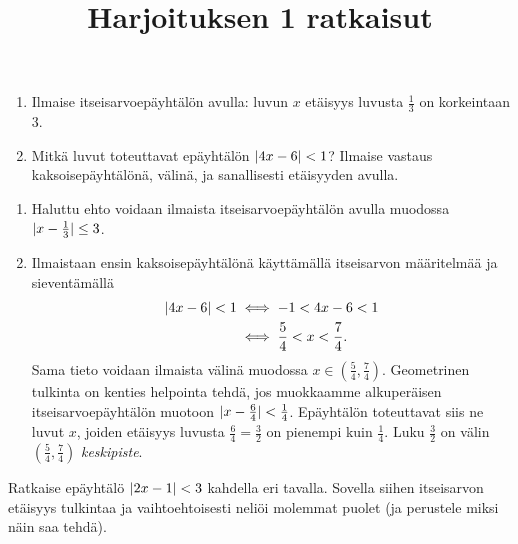\documentclass[12pt,a4paper]{article}
\title{Harjoituksen 1 ratkaisut}
\author{}
\date{}
\begin{document}
\maketitle

\noindent

\begin{exercise}
  \leavevmode\par
\begin{enumerate}[label=\alph*), nosep]
  \item Ilmaise itseisarvoepäyhtälön avulla: luvun \(x\) etäisyys luvusta
    \(\frac{1}{3}\) on korkeintaan \(3\).
  \item Mitkä luvut toteuttavat epäyhtälön \(\lvert4x - 6\rvert < 1\)? Ilmaise
    vastaus kaksoisepäyhtälönä, välinä, ja sanallisesti etäisyyden avulla.
\end{enumerate}
\end{exercise}

\begin{solution}
\leavevmode\par
\begin{enumerate}[label=\alph*), nosep]
\item Haluttu ehto voidaan ilmaista itseisarvoepäyhtälön avulla muodossa
  \(\lvert x - \frac{1}{3}\rvert \leq 3\).
\item Ilmaistaan ensin kaksoisepäyhtälönä käyttämällä itseisarvon määritelmää
  ja sieventämällä
  \begin{align*}
    \lvert4x - 6\rvert < 1 &\iff -1 < 4x - 6 < 1 \\
    &\iff \frac{5}{4} < x < \frac{7}{4}.
  \end{align*}
  Sama tieto voidaan ilmaista välinä muodossa \(x \in \left(\frac{5}{4},
  \frac{7}{4}\right)\). Geometrinen tulkinta on kenties helpointa tehdä, jos
  muokkaamme alkuperäisen itseisarvoepäyhtälön muotoon
  \(\lvert x - \frac{6}{4}\rvert < \frac{1}{4}\). Epäyhtälön toteuttavat siis ne luvut
  \(x\), joiden etäisyys luvusta \(\frac{6}{4} = \frac{3}{2}\) on pienempi kuin
  \(\frac{1}{4}\). Luku \(\frac{3}{2}\) on välin
  \(\left(\frac{5}{4}, \frac{7}{4}\right)\) \emph{keskipiste}.
\end{enumerate}
\end{solution}

\begin{exercise}
Ratkaise epäyhtälö \(\lvert2x - 1\rvert < 3\) kahdella eri tavalla. Sovella siihen
itseisarvon etäisyys tulkintaa ja vaihtoehtoisesti neliöi molemmat puolet
(ja perustele miksi näin saa tehdä).
\end{exercise}
\end{document}
